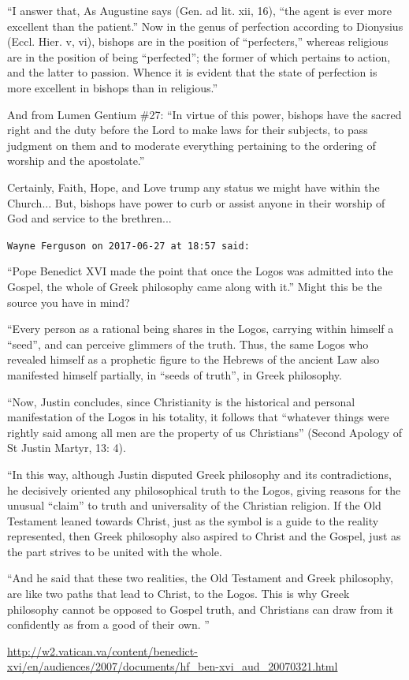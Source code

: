 \begin{footnotesize}
\begin{sffamily}
``I answer that, As Augustine says (Gen. ad lit. xii, 16), ``the agent is ever more excellent than the patient.'' Now in the genus of perfection according to Dionysius (Eccl. Hier. v, vi), bishops are in the position of ``perfecters,'' whereas religious are in the position of being ``perfected''; the former of which pertains to action, and the latter to passion. Whence it is evident that the state of perfection is more excellent in bishops than in religious.''

And from Lumen Gentium \#27: ``In virtue of this power, bishops have the sacred right and the duty before the Lord to make laws for their subjects, to pass judgment on them and to moderate everything pertaining to the ordering of worship and the apostolate.''

Certainly, Faith, Hope, and Love trump any status we might have within the Church... But, bishops have power to curb or assist anyone in their worship of God and service to the brethren... 

\hfill

\texttt{Wayne Ferguson on 2017-06-27 at 18:57 said:} 

``Pope Benedict XVI made the point that once the Logos was admitted into the Gospel, the whole of Greek philosophy came along with it.'' Might this be the source you have in mind?

``Every person as a rational being shares in the Logos, carrying within himself a ``seed'', and can perceive glimmers of the truth. Thus, the same Logos who revealed himself as a prophetic figure to the Hebrews of the ancient Law also manifested himself partially, in ``seeds of truth'', in Greek philosophy.

``Now, Justin concludes, since Christianity is the historical and personal manifestation of the Logos in his totality, it follows that ``whatever things were rightly said among all men are the property of us Christians'' (Second Apology of St Justin Martyr, 13: 4).

``In this way, although Justin disputed Greek philosophy and its contradictions, he decisively oriented any philosophical truth to the Logos, giving reasons for the unusual ``claim'' to truth and universality of the Christian religion. If the Old Testament leaned towards Christ, just as the symbol is a guide to the reality represented, then Greek philosophy also aspired to Christ and the Gospel, just as the part strives to be united with the whole.

``And he said that these two realities, the Old Testament and Greek philosophy, are like two paths that lead to Christ, to the Logos. This is why Greek philosophy cannot be opposed to Gospel truth, and Christians can draw from it confidently as from a good of their own. ''

\url{http://w2.vatican.va/content/benedict-xvi/en/audiences/2007/documents/hf_ben-xvi_aud_20070321.html}


\hfill

\end{sffamily}
\end{footnotesize}

